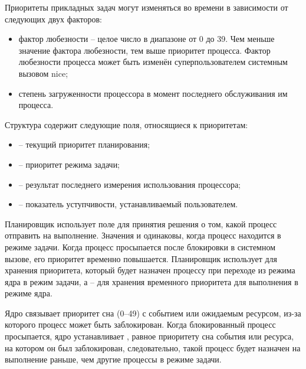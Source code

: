 Приоритеты прикладных задач могут изменяться во времени в зависимости от следующих двух факторов:

\begin{itemize}
	\item фактор любезности – целое число в диапазоне от 0 до 39. Чем меньше значение фактора любезности, тем выше приоритет процесса. Фактор любезности процесса может быть изменён суперпользователем системным вызовом {\ttfamily nice};
	
	\item степень загруженности процессора в момент последнего обслуживания им процесса.
\end{itemize}

Структура  содержит следующие поля, относящиеся к приоритетам:
\begin{itemize}
	\item {} -- текущий приоритет планирования;
	\item {} -- приоритет режима задачи;
	\item {} -- результат последнего измерения использования процессора;
	\item {} -- показатель уступчивости, устанавливаемый пользователем.
\end{itemize}

Планировщик использует поле  для принятия решения о том, какой процесс отправить на выполнение. Значения  и  одинаковы, когда процесс находится в режиме задачи. Когда процесс просыпается после блокировки в системном вызове, его приоритет временно повышается. Планировщик использует  для хранения приоритета, который будет назначен процессу при переходе из режима ядра в режим задачи, а  -- для хранения временного приоритета для выполнения в режиме ядра.

Ядро связывает приоритет сна (0--49) с событием или ожидаемым ресурсом, из-за которого процесс может быть заблокирован. Когда блокированный процесс просыпается, ядро устанавливает , равное приоритету сна события или ресурса, на котором он был заблокирован, следовательно, такой процесс будет назначен на выполнение раньше, чем другие процессы в режиме задачи. 

